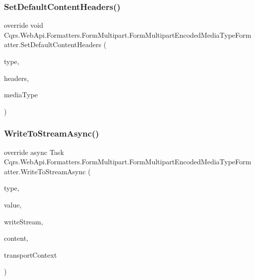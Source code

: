 \subsubsection{\texorpdfstring{Set\+Default\+Content\+Headers()}{SetDefaultContentHeaders()}}
{\footnotesize\ttfamily override void Cqrs.\+Web\+Api.\+Formatters.\+Form\+Multipart.\+Form\+Multipart\+Encoded\+Media\+Type\+Formatter.\+Set\+Default\+Content\+Headers (\begin{DoxyParamCaption}\item[{Type}]{type,  }\item[{Http\+Content\+Headers}]{headers,  }\item[{Media\+Type\+Header\+Value}]{media\+Type }\end{DoxyParamCaption})}

\mbox{\label{classCqrs_1_1WebApi_1_1Formatters_1_1FormMultipart_1_1FormMultipartEncodedMediaTypeFormatter_aced660e9ab818558fc5728ec82e2434e}} 
\subsubsection{\texorpdfstring{Write\+To\+Stream\+Async()}{WriteToStreamAsync()}}
{\footnotesize\ttfamily override async Task Cqrs.\+Web\+Api.\+Formatters.\+Form\+Multipart.\+Form\+Multipart\+Encoded\+Media\+Type\+Formatter.\+Write\+To\+Stream\+Async (\begin{DoxyParamCaption}\item[{Type}]{type,  }\item[{object}]{value,  }\item[{Stream}]{write\+Stream,  }\item[{Http\+Content}]{content,  }\item[{Transport\+Context}]{transport\+Context }\end{DoxyParamCaption})}

